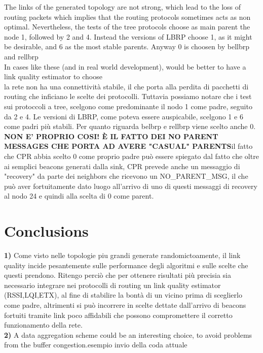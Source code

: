 \documentclass{article}
\begin{document}
The links of the generated topology are not strong, which lead to the loss of routing packets which implies that the routing protocols sometimes acts as non optimal. Nevertheless, the tests of the tree protocols choose as main parent the node 1, followed by 2 and 4. Instead the versions of LBRP choose 1, as it might be desirable, and 6 as the most stable parents. Anyway 0 is choosen by bellbrp and rellbrp
\\ In cases like these (and in real world development), would be better to have a link quality estimator to choose 
\\la rete non ha una connettività stabile, il che porta alla perdita di pacchetti di routing che inficiano le scelte dei protocolli. Tuttavia possiamo notare che i test sui protoccoli a tree, scelgono come predominante il nodo 1 come padre, seguito da 2 e 4. Le versioni di LBRP, come poteva essere auspicabile, scelgono 1 e 6 come padri più stabili. Per quanto riguarda belbrp e rellbrp viene scelto anche 0.
\textbf{NON E' PROPRIO COSI! È IL FATTO DEI NO PARENT MESSAGES CHE PORTA AD AVERE "CASUAL" PARENTS}il fatto che CPR abbia scelto 0 come proprio padre può essere spiegato dal fatto che oltre ai semplici beacons generati dalla sink, CPR prevede anche un messaggio di "recovery" da parte dei neighbors che ricevono un NO\_PARENT\_MSG, il che può aver fortuitamente dato luogo all'arrivo di uno di questi messaggi di recovery al nodo 24 e quindi alla scelta di 0 come parent.
\clearpage

\section{Conclusions}
\textbf{1)} Come visto nelle topologie piu grandi generate randomictoamente, il link quality incide pesantemente sulle performance degli algoritmi e sulle scelte che questi prendono. Ritengo perciò che per ottenere risultati più precisia sia necessario integrare nei protocolli di routing un link quality estimator (RSSI,LQI,ETX), al fine di stabilire la bontà di un vicino prima di sceglierlo come padre, altrimenti si può incorrere in scelte dettate dall'arrivo di beacons fortuiti tramite link poco affidabili che possono compromettere il corretto funzionamento della rete.
\\ \textbf{2)} A data aggregation scheme could be an interesting choice, to avoid problems from the buffer congestion.esempio invio della coda attuale
\clearpage
\end{document}
